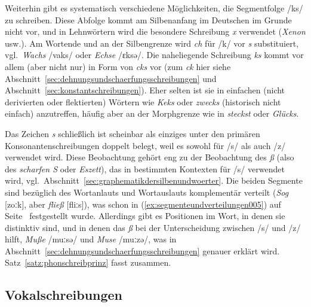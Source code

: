 Weiterhin gibt es systematisch verschiedene Möglichkeiten, die Segmentfolge /ks/ zu schreiben.
Diese Abfolge kommt am Silbenanfang im Deutschen im Grunde nicht vor, und in Lehnwörtern wird die besondere Schreibung \textit{x} verwendet (\textit{Xenon} usw.).
Am Wortende und an der Silbengrenze wird \textit{ch} für /k/ vor \textit{s} substituiert, vgl.\ \textit{Wachs} /vaks/ oder \textit{Echse} /ɛksə/.
Die naheliegende Schreibung \textit{ks} kommt vor allem (aber nicht nur) in Form von \textit{cks} vor (zum \textit{ck} hier siehe Abschnitt~\ref{sec:dehnungsundschaerfungsschreibungen} und Abschnitt~\ref{sec:konstantschreibungen}).
Eher selten ist sie in einfachen (nicht derivierten oder flektierten) Wörtern wie \textit{Keks} oder \textit{zwecks} (historisch nicht einfach) anzutreffen, häufig aber an der Morphgrenze wie in \textit{steckst} oder \textit{Glücks}.

Das Zeichen \textit{s} schließlich ist scheinbar als einziges unter den primären Konsonantenschreibungen doppelt belegt, weil es sowohl für /s/ als auch /z/ verwendet wird.
Diese Beobachtung gehört eng zu der Beobachtung des \textit{ß} (also des \textit{scharfen S} oder \textit{Eszett}), das in bestimmten Kontexten für /s/ verwendet wird, vgl.\ Abschnitt~\ref{sec:graphematikdersilbenundwoerter}.
Die beiden Segmente sind bezüglich des Wortanlauts und Wortauslauts komplementär verteilt (\textit{Sog} [zoːk], aber \textit{fließ} [fliːs]), was schon in (\ref{ex:segmenteundverteilungen005}) auf Seite~\pageref{ex:segmenteundverteilungen005} festgestellt wurde.
Allerdings gibt es Positionen im Wort, in denen sie distinktiv sind, und in denen das \textit{ß} bei der Unterscheidung zwischen /s/ und /z/ hilft, \zB \textit{Muße} /muːsə/ und \textit{Muse} /muːzə/, was in Abschnitt~\ref{sec:dehnungsundschaerfungsschreibungen} genauer erklärt wird.
Satz~\ref{satz:phonschreibprinz} fasst zusammen.



\subsection{Vokalschreibungen}
\label{sec:vokalschreibungen}

